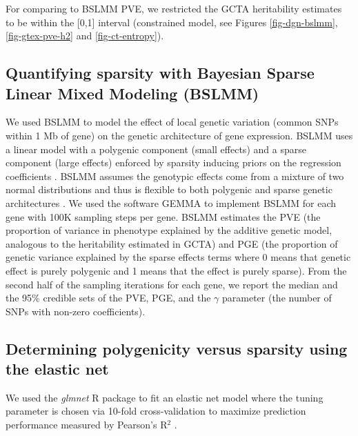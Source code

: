 \documentclass[10pt,letterpaper]{article}
\begin{document}
For comparing to BSLMM PVE, we restricted the GCTA heritability estimates to be within the [0,1] interval (constrained model, see Figures \ref{fig-dgn-bslmm}, \ref{fig-gtex-pve-h2} and \ref{fig-ct-entropy}). 

\subsection*{Quantifying sparsity with Bayesian Sparse Linear Mixed
Modeling
(BSLMM)}\label{quantifying-sparsity-with-bayesian-sparse-linear-mixed-models-bslmm}

We used BSLMM \cite{Zhou_2013} to model the effect of local genetic variation
(common SNPs within 1 Mb of gene) on the genetic architecture of gene
expression. BSLMM uses a linear model with a polygenic component (small effects) and a sparse component (large effects)
enforced by sparsity inducing priors on the
regression coefficients \cite{Zhou_2013}. BSLMM assumes the genotypic effects come from a mixture of two normal distributions and thus is flexible to both polygenic and sparse genetic architectures \cite{Zhou_2013}. We used the software GEMMA \cite{Zhou_2012} to
implement BSLMM for each gene %
with 100K sampling steps per gene.
BSLMM estimates the PVE (the proportion of variance in
phenotype explained by the additive genetic model, analogous to the heritability estimated in GCTA) and PGE (the proportion of genetic variance explained by the sparse effects terms where 0 means that genetic effect is purely polygenic and 1 means that the effect is purely sparse). From the second half of the sampling iterations for each gene, we report the median and the 95\% credible sets of the
PVE, PGE, and the \textbar{}\(\gamma\)\textbar{} parameter (the number of SNPs with non-zero coefficients).


\subsection*{Determining polygenicity versus sparsity using the elastic
net}\label{determining-polygenicity-versus-sparsity-using-the-elastic-net}

We used the \textit{glmnet} R package to fit an elastic net model where the tuning parameter is chosen via 10-fold cross-validation to maximize prediction performance measured by Pearson's R$^2$ \cite{Friedman_2010, Simon_2011}.
\end{document}
